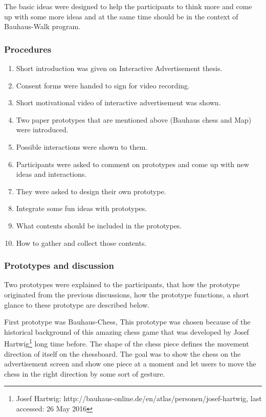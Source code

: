 The basic ideas were designed to help the participants to think more and come up with some more ideas and at the same time should be in the context of Bauhaus-Walk program. 

\subsubsection{Procedures}
\begin{enumerate}
\item   Short introduction was given on Interactive Advertisement thesis.
\item   Consent forms were handed to sign for video recording.
\item	Short motivational video of interactive advertisement was shown.
\item	Two paper prototypes that are mentioned above (Bauhaus chess and Map) were introduced.
\item	Possible interactions were shown to them.
\item	Participants were asked to comment on prototypes and come up with new ideas and interactions.
\item	They were asked to design their own prototype.
\item	Integrate some fun ideas with prototypes.
\item	What contents should be included in the prototypes.
\item	How to gather and collect those contents.
\end{enumerate}

\subsubsection{Prototypes and discussion}
Two prototypes were explained to the participants, that how the prototype originated from the previous discussions, how the prototype functions, a short glance to these prototype are described below. 

First prototype was Bauhaus-Chess, This prototype was chosen because of the historical background of this amazing chess game that was developed by Josef Hartwig\footnote{Josef Hartwig: http://bauhaus-online.de/en/atlas/personen/josef-hartwig, last accessed: 26 May 2016} long time before. The shape of the chess piece defines the movement direction of itself on the chessboard. The goal was to show the chess on the advertisement screen and show one piece at a moment and let users to move the chess in the right direction by some sort of gesture. 

